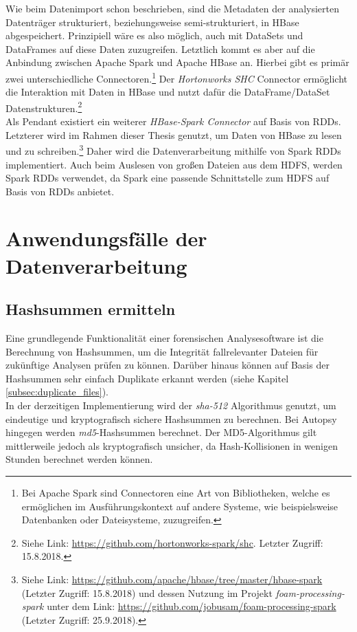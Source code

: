 \noindent
Wie beim Datenimport schon beschrieben, sind die Metadaten der analysierten Datenträger strukturiert, beziehungsweise semi-strukturiert, in HBase abgespeichert. Prinzipiell wäre es also möglich, auch mit DataSets und DataFrames auf diese Daten zuzugreifen. Letztlich kommt es aber auf die Anbindung zwischen Apache Spark und Apache HBase an. Hierbei gibt es primär zwei unterschiedliche Connectoren.\footnote{Bei Apache Spark sind Connectoren eine Art von Bibliotheken, welche es ermöglichen im Ausführungskontext auf andere Systeme, wie beispielsweise Datenbanken oder Dateisysteme, zuzugreifen.} Der \textit{Hortonworks SHC} Connector ermöglicht die Interaktion mit Daten in HBase und nutzt dafür die DataFrame/DataSet Datenstrukturen.\footnote{Siehe Link: \url{https://github.com/hortonworks-spark/shc}. Letzter Zugriff: 15.8.2018.}\\ 
Als Pendant existiert ein weiterer \textit{HBase-Spark Connector} auf Basis von RDDs. Letzterer wird im Rahmen dieser Thesis genutzt, um Daten von HBase zu lesen und zu schreiben.\footnote{Siehe Link: \url{https://github.com/apache/hbase/tree/master/hbase-spark} (Letzter Zugriff: 15.8.2018) und dessen Nutzung im Projekt \textit{foam-processing-spark} unter dem Link: \url{https://github.com/jobusam/foam-processing-spark} (Letzter Zugriff: 25.9.2018).}
Daher wird die Datenverarbeitung mithilfe von Spark RDDs implementiert. Auch beim Auslesen von großen Dateien aus dem HDFS, werden Spark RDDs verwendet, da Spark eine passende Schnittstelle zum HDFS auf Basis von RDDs anbietet.


\section{Anwendungsfälle der Datenverarbeitung}
\subsection{Hashsummen ermitteln}
Eine grundlegende Funktionalität einer forensischen Analysesoftware ist die Berechnung von Hashsummen, um die Integrität fallrelevanter Dateien für zukünftige Analysen prüfen zu können. Darüber hinaus können auf Basis der Hashsummen sehr einfach Duplikate erkannt werden (siehe Kapitel \ref{subsec:duplicate_files}).\\
In der derzeitigen Implementierung wird der \textit{\acrshort{sha}-512} Algorithmus genutzt, um eindeutige und kryptografisch sichere Hashsummen zu berechnen. Bei Autopsy hingegen werden \textit{\acrshort{md5}}-Hashsummen berechnet. Der MD5-Algorithmus gilt mittlerweile jedoch als kryptografisch unsicher, da Hash-Kollisionen in wenigen Stunden berechnet werden können.\cite[S. 240-243]{hacking_and_security}\\

